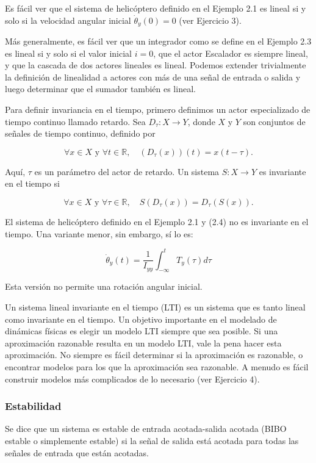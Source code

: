 \documentclass[12pt,a4paper]{article}
\begin{document}
Es fácil ver que el sistema de helicóptero definido en el Ejemplo 2.1 es lineal si y solo si la velocidad angular inicial $\dot{\theta}_y(0) = 0$ (ver Ejercicio 3).

Más generalmente, es fácil ver que un integrador como se define en el Ejemplo 2.3 es lineal si y solo si el valor inicial $i = 0$, que el actor Escalador es siempre lineal, y que la cascada de dos actores lineales es lineal. Podemos extender trivialmente la definición de linealidad a actores con más de una señal de entrada o salida y luego determinar que el sumador también es lineal.

Para definir invariancia en el tiempo, primero definimos un actor especializado de tiempo continuo llamado
retardo. Sea $D_\tau : X \rightarrow Y$, donde $X$ y $Y$ son conjuntos de señales de tiempo continuo, definido por

\[
\forall x \in X \text{ y } \forall t \in \mathbb{R}, \quad (D_\tau(x))(t) = x(t-\tau). \tag{2.7}
\]

Aquí, $\tau$ es un parámetro del actor de retardo. Un sistema $S : X \rightarrow Y$ es invariante en el tiempo si

\[
\forall x \in X \text{ y } \forall \tau \in \mathbb{R}, \quad S(D_\tau(x)) = D_\tau(S(x)).
\]

El sistema de helicóptero definido en el Ejemplo 2.1 y (2.4) no es invariante en el tiempo. Una variante menor, sin embargo, sí lo es:

\[
\dot{\theta}_y(t) = \frac{1}{I_{yy}} \int_{-\infty}^{t} T_y(\tau) d\tau
\]

Esta versión no permite una rotación angular inicial.

Un sistema lineal invariante en el tiempo (LTI) es un sistema que es tanto lineal como invariante en el tiempo.
Un objetivo importante en el modelado de dinámicas físicas es elegir un modelo LTI siempre que sea posible. Si una aproximación razonable resulta en un modelo LTI, vale la pena hacer esta aproximación. No siempre es fácil determinar si la aproximación es razonable, o encontrar modelos para los que la aproximación sea razonable. A menudo es fácil construir modelos más complicados de lo necesario (ver Ejercicio 4).

\subsubsection{Estabilidad}

Se dice que un sistema es estable de entrada acotada-salida acotada (BIBO estable o simplemente estable) si la señal de salida está acotada para todas las señales de entrada que están acotadas.
\end{document}
